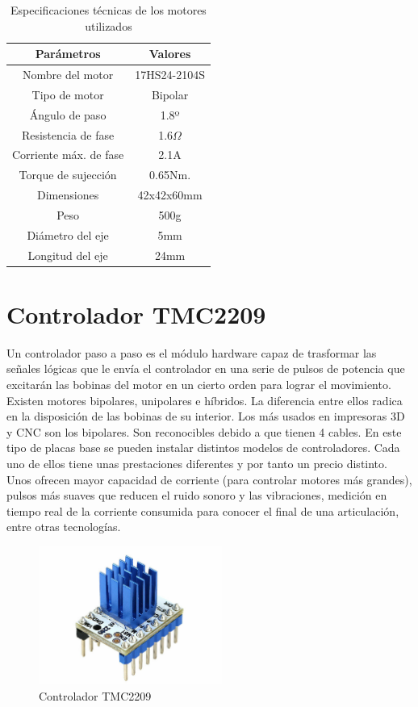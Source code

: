 \begin{table}[H]
\begin{center}
\begin{tabular}{|c|c|}
\hline
\textbf{Parámetros} & \textbf{Valores} \\
\hline
Nombre del motor & 17HS24-2104S \\
Tipo de motor & Bipolar \\
Ángulo de paso & 1.8º \\
Resistencia de fase & 1.6$\Omega$ \\
Corriente máx. de fase & 2.1A \\
Torque de sujección & 0.65Nm. \\
Dimensiones & 42x42x60mm \\
Peso & 500g \\
Diámetro del eje & 5mm \\
Longitud del eje & 24mm \\
\hline
\end{tabular}
\caption{Especificaciones técnicas de los motores utilizados}
\label{cuadro:ejemplo}
\end{center}
\end{table}

\section{Controlador TMC2209}
\label{subsec:controladorPAP}
Un controlador paso a paso es el módulo hardware capaz de trasformar las señales lógicas que le envía el controlador en una serie de pulsos de
potencia que excitarán las bobinas del motor en un cierto orden para lograr el movimiento. 
Existen motores bipolares, unipolares e híbridos. La diferencia entre ellos radica en la disposición de las bobinas de su interior. Los más usados 
en impresoras 3D y CNC son los bipolares. Son reconocibles debido a que tienen 4 cables.
En este tipo de placas base se pueden instalar distintos modelos de controladores. Cada uno de ellos tiene unas prestaciones diferentes y por tanto 
un precio distinto. Unos ofrecen mayor capacidad de corriente (para controlar motores más grandes), pulsos más suaves que reducen el 
ruido sonoro y las vibraciones, medición en tiempo real de la corriente consumida para conocer el final de una articulación, entre otras tecnologías.  
\begin{figure} [h!]
    \begin{center}
      \includegraphics[width=6cm]{figs/TMC2209.jpg}
    \end{center}
    \caption{Controlador TMC2209}
    \label{fig:robSoldering}
\end{figure}\ 

